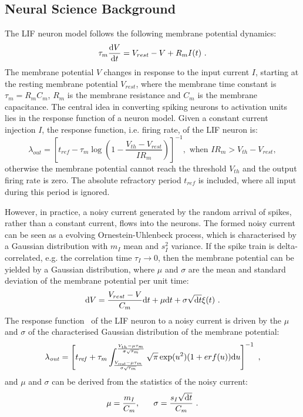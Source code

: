 \subsection{Neural Science Background}
	The LIF neuron model follows the following membrane potential dynamics:
	\begin{equation}
	\tau_m \frac{\mathrm{d} V}{\mathrm{d} t}=V_{rest} - V + R_{m} I(t) ~.
	\label{eq:LIF_V}
	\end{equation}
	The membrane potential $V$ changes in response to the input current $I$, starting at the resting membrane potential $V_{rest}$, where the membrane time constant is $\tau_m = R_mC_m$, $R_m$ is the membrane resistance and $C_m$ is the membrane capacitance.
	The central idea in converting spiking neurons to activation units lies in the response function of a neuron model.
	Given a constant current injection $I$, the response function, i.e. firing rate, of the LIF neuron is:
	\begin{equation}
	\lambda_\mathit{out}=
	\left [ t_\mathit{ref}-\tau_m\log \left ( 1-\frac{V_{th}-V_\mathit{rest}}{IR_m}  \right )\right ]^{-1}, \textrm{~when~} IR_m>V_{th}-V_{rest},
	\label{equ:consI}
	\end{equation}
	otherwise the membrane potential cannot reach the threshold $V_{th}$ and the output firing rate is zero. 
	The absolute refractory period $t_\mathit{ref}$ is included, where all input during this period is ignored.
	
	However, in practice, a noisy current generated by the random arrival of spikes, rather than a constant current, flows into the neurons.
	The formed noisy current can be seen as a evolving Ornestein-Uhlenbeck process, which is characterised by a Gaussian distribution with $m_I$ mean and $s^2_I$ variance.
	If the spike train is delta-correlated, e.g. the correlation time $\tau_I \rightarrow 0$, then the membrane potential can be yielded by a Gaussian distribution, where $\mu$ and $\sigma$ are the mean and standard deviation of the membrane potential per unit time:
	\begin{equation}
	\mathrm{d} V= \dfrac{V_{rest} - V}{C_m}\mathrm{d} t + \mu \mathrm{d} t + \sigma \sqrt{\mathrm{d} t} \xi(t) ~.
	\end{equation}	
	The response function~\cite{rauch2003neocortical,la2008response} of the LIF neuron to a noisy current is driven by the $\mu$ and $\sigma$ of the characterised Gaussian distribution of the membrane potential:
	\begin{equation}
	\lambda_\mathit{out}=
	\left [ t_\mathit{ref}+\tau_m \int_{\frac{V_\mathit{rest}-\mu \tau_m }{\sigma \sqrt{\tau_m}}}^{\frac{V_{th}-\mu \tau_m }{\sigma \sqrt{\tau_m}}} \sqrt{\pi} \exp(u^{2}) (1+erf(u)) \mathrm{d} u \right ]^{-1} ~,
	\label{equ:noiseI}
	\end{equation}
	and $\mu$ and $\sigma$ can be derived from the statistics of the noisy current:
	\begin{equation}
	\mu =\dfrac{m_I}{C_m}, ~~~~~ \sigma = \dfrac{s_I \sqrt{\mathrm{d} t}}{C_m}~.
	\end{equation}


